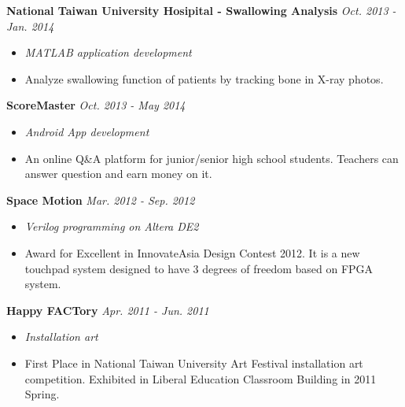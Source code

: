 \documentclass[11pt,letterpaper]{article}
\begin{document}
%
\noindent \hspace{1.2em}
{\bf National Taiwan University Hosipital - Swallowing Analysis} \hfill {\em Oct. 2013 - Jan. 2014}
\vspace{-0.5em}
\begin{itemize}[leftmargin=1.5em] \item[] {\em MATLAB application development} \end{itemize}
\vspace{-0.5em}
\begin{itemize}[leftmargin=1.5em]
	\itemsep=-0.5em
	\item[] Analyze swallowing function of patients by tracking bone in X-ray photos.
\end{itemize}

%
\noindent \hspace{1.2em}
{\bf ScoreMaster} \hfill {\em Oct. 2013 - May 2014}
\vspace{-0.5em}
\begin{itemize}[leftmargin=1.5em] \item[] {\em Android App development} \end{itemize}
\vspace{-0.5em}
\begin{itemize}[leftmargin=1.5em]
	\itemsep=-0.5em
	\item[] An online Q\&A platform for junior/senior high school students. Teachers can answer question and earn money on it.
\end{itemize}

%
\noindent \hspace{1.2em}
{\bf Space Motion} \hfill {\em Mar. 2012 - Sep. 2012}
\vspace{-0.5em}
\begin{itemize}[leftmargin=1.5em] \item[] {\em Verilog programming on Altera DE2 } \end{itemize}
\vspace{-0.5em}
\begin{itemize}[leftmargin=1.5em]
	\itemsep=-0.5em
	\item[] Award for Excellent in InnovateAsia Design Contest 2012. It is a new touchpad system designed to have 3 degrees of freedom based on FPGA system.
\end{itemize}

%
\noindent \hspace{1.2em}
{\bf Happy FACTory} \hfill {\em Apr. 2011 - Jun. 2011}
\vspace{-0.5em}
\begin{itemize}[leftmargin=1.5em] \item[] {\em Installation art} \end{itemize}
\vspace{-0.5em}
\begin{itemize}[leftmargin=1.5em]
	\itemsep=-0.5em
	\item[] First Place in National Taiwan University Art Festival installation art competition. Exhibited in Liberal Education Classroom Building in 2011 Spring.
\end{itemize}
\end{document}
